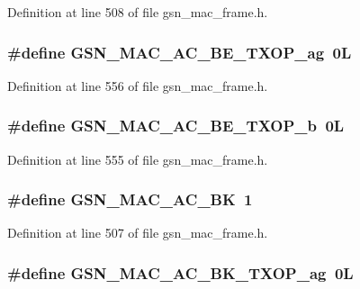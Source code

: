 Definition at line 508 of file gsn\_\-mac\_\-frame.h.

\hypertarget{a00523_a0b0c9c617fa57a50f5a70cd09f733d5c}{
\subsubsection[{GSN\_\-MAC\_\-AC\_\-BE\_\-TXOP\_\-ag}]{\setlength{\rightskip}{0pt plus 5cm}\#define GSN\_\-MAC\_\-AC\_\-BE\_\-TXOP\_\-ag~0L}}
\label{a00523_a0b0c9c617fa57a50f5a70cd09f733d5c}


Definition at line 556 of file gsn\_\-mac\_\-frame.h.

\hypertarget{a00523_a2f958052bd9d2407fd4d5ce76d6c1515}{
\subsubsection[{GSN\_\-MAC\_\-AC\_\-BE\_\-TXOP\_\-b}]{\setlength{\rightskip}{0pt plus 5cm}\#define GSN\_\-MAC\_\-AC\_\-BE\_\-TXOP\_\-b~0L}}
\label{a00523_a2f958052bd9d2407fd4d5ce76d6c1515}


Definition at line 555 of file gsn\_\-mac\_\-frame.h.

\hypertarget{a00523_a540081039d0bce9eeac4a707840a0d87}{
\subsubsection[{GSN\_\-MAC\_\-AC\_\-BK}]{\setlength{\rightskip}{0pt plus 5cm}\#define GSN\_\-MAC\_\-AC\_\-BK~1}}
\label{a00523_a540081039d0bce9eeac4a707840a0d87}


Definition at line 507 of file gsn\_\-mac\_\-frame.h.

\hypertarget{a00523_a5b9233758256a20a02335ebc50589f06}{
\subsubsection[{GSN\_\-MAC\_\-AC\_\-BK\_\-TXOP\_\-ag}]{\setlength{\rightskip}{0pt plus 5cm}\#define GSN\_\-MAC\_\-AC\_\-BK\_\-TXOP\_\-ag~0L}}
\label{a00523_a5b9233758256a20a02335ebc50589f06}


